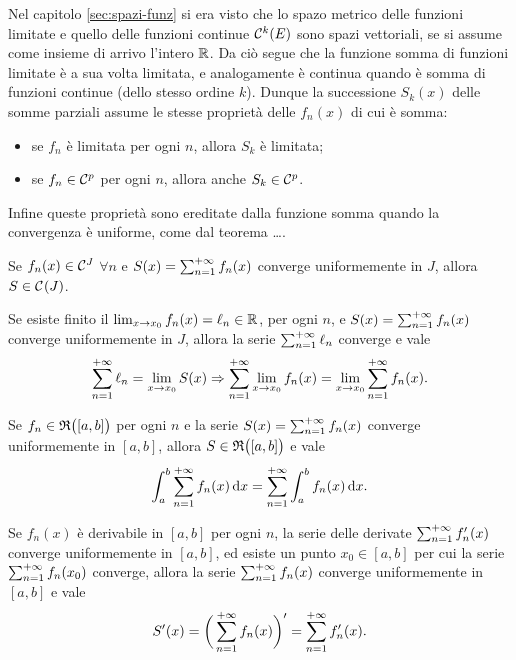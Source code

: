 Nel capitolo \ref{sec:spazi-funz} si era visto che lo spazo metrico delle funzioni limitate e quello delle funzioni continue $\mathcal{C}^{{k}}(E)$ sono spazi vettoriali, se si assume come insieme di arrivo l'intero $\mathbb{R}$. Da ciò segue che la funzione somma di funzioni limitate è a sua volta limitata, e analogamente è continua quando è somma di funzioni continue (dello stesso ordine $k$). Dunque la successione $S_k(x)$ delle somme parziali assume le stesse proprietà delle $f_n(x)$ di cui è somma:
\begin{itemize}
\item se $f_n$ è limitata per ogni $n$, allora $S_k$ è limitata;
\item se $f_n\in\mathcal{C}^{{p}}$ per ogni $n$, allora anche $S_k\in\mathcal{C}^{{p}}$.
\end{itemize}
Infine queste proprietà sono ereditate dalla funzione somma quando la convergenza è uniforme, come dal teorema \dots.
\begin{teorema}
Se $f_n(x)\in\mathcal{C}^{{J}}$ $\forall n$ e $S(x)=\sum_{{n}=1}^{+\infty}f_n(x)$ converge uniformemente in $J$, allora $S\in\mathcal{C}^{{}}(J)$.
\end{teorema}
\begin{teorema} \label{t:continuita_serie_conv_uniforme}
Se esiste finito il $\lim_{x\to x_0}f_n(x)=\ell_n\in\mathbb{R}$, per ogni $n$, e $S(x)=\sum_{{n}=1}^{+\infty}f_n(x)$ converge uniformemente in $J$, allora la serie $\sum_{{n}=1}^{+\infty}\ell_n$ converge e vale
\[
\sum_{{n}=1}^{+\infty}\ell_n=\lim_{x\to x_0}S(x)\Rightarrow\sum_{{n}=1}^{+\infty}\lim_{x\to x_0}f_n(x)=\lim_{x\to x_0}\sum_{{n}=1}^{+\infty}f_n(x).
\]
\end{teorema}
\begin{teorema} \label{t:scambio_integrale_serie}
Se $f_n\in\mathfrak{R}\big([a,b]\big)$ per ogni $n$ e la serie $S(x)=\sum_{{n}=1}^{+\infty}f_n(x)$ converge uniformemente in $[a,b]$, allora $S\in\mathfrak{R}\big([a,b]\big)$ e vale
\[
\int_a^b\sum_{{n}=1}^{+\infty}f_n(x)\,\textup{d} x=\sum_{{n}=1}^{+\infty}\int_a^bf_n(x)\,\textup{d} x.
\]
\end{teorema}
\begin{teorema} \label{t:scambio_derivata_serie}
Se $f_n(x)$ è derivabile in $[a,b]$ per ogni $n$, la serie delle derivate $\sum_{{n}=1}^{+\infty}f_n'(x)$ converge uniformemente in $[a,b]$, ed esiste un punto $x_0\in[a,b]$ per cui la serie $\sum_{{n}=1}^{+\infty}f_n(x_0)$ converge, allora la serie $\sum_{{n}=1}^{+\infty}f_n(x)$ converge uniformemente in $[a,b]$ e vale
\[
S'(x)=\bigg(\sum_{{n}=1}^{+\infty}f_n(x)\bigg)'=\sum_{{n}=1}^{+\infty}f_n'(x).
\]
\end{teorema}

